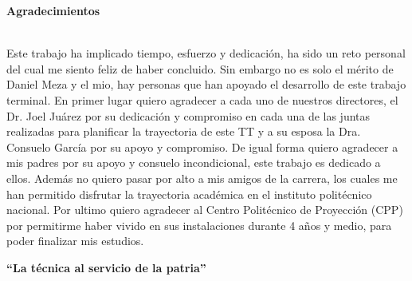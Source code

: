




\begin{LARGE}
	\textbf{Agradecimientos}\\\\
\end{LARGE}



\begin{tcolorbox}[adjusted title=flush center,halign title=flush center,titlerule=3mm,title= \large{Carlos A. Hernandez G.}] 

Este trabajo ha implicado tiempo, esfuerzo y dedicación, ha sido un reto personal del cual me siento feliz de haber concluido. Sin embargo no es solo el mérito de Daniel Meza y el mio, hay personas que han apoyado el desarrollo de este trabajo terminal. En primer lugar quiero agradecer a cada uno de nuestros directores, el Dr. Joel Juárez por su dedicación y compromiso en cada una de las juntas realizadas para planificar la trayectoria de este TT y a su esposa la Dra. Consuelo García por su apoyo y compromiso. De igual forma quiero agradecer a mis padres por su apoyo y consuelo incondicional, este trabajo es dedicado a ellos. Además no quiero pasar por alto a mis amigos de la carrera, los cuales me han permitido disfrutar la trayectoria académica en el instituto politécnico nacional. Por ultimo quiero agradecer al Centro Politécnico de Proyección (CPP) por permitirme haber vivido en sus instalaciones durante 4 años y medio, para poder finalizar mis estudios.\\

\begin{center}\textbf{``La técnica al servicio de la patria''}\end{center}



\end{tcolorbox}

\ \\

